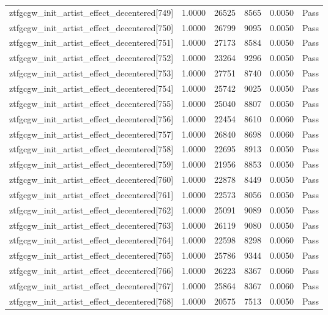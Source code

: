 \begin{table}[htbp]
\begin{tabular}{llrrll}
ztfgcgw\_init\_artist\_effect\_decentered[749] & 1.0000 & 26525 & 8565 & 0.0050 & Pass \\
ztfgcgw\_init\_artist\_effect\_decentered[750] & 1.0000 & 26799 & 9095 & 0.0050 & Pass \\
ztfgcgw\_init\_artist\_effect\_decentered[751] & 1.0000 & 27173 & 8584 & 0.0050 & Pass \\
ztfgcgw\_init\_artist\_effect\_decentered[752] & 1.0000 & 23264 & 9296 & 0.0050 & Pass \\
ztfgcgw\_init\_artist\_effect\_decentered[753] & 1.0000 & 27751 & 8740 & 0.0050 & Pass \\
ztfgcgw\_init\_artist\_effect\_decentered[754] & 1.0000 & 25742 & 9025 & 0.0050 & Pass \\
ztfgcgw\_init\_artist\_effect\_decentered[755] & 1.0000 & 25040 & 8807 & 0.0050 & Pass \\
ztfgcgw\_init\_artist\_effect\_decentered[756] & 1.0000 & 22454 & 8610 & 0.0060 & Pass \\
ztfgcgw\_init\_artist\_effect\_decentered[757] & 1.0000 & 26840 & 8698 & 0.0060 & Pass \\
ztfgcgw\_init\_artist\_effect\_decentered[758] & 1.0000 & 22695 & 8913 & 0.0050 & Pass \\
ztfgcgw\_init\_artist\_effect\_decentered[759] & 1.0000 & 21956 & 8853 & 0.0050 & Pass \\
ztfgcgw\_init\_artist\_effect\_decentered[760] & 1.0000 & 22878 & 8449 & 0.0050 & Pass \\
ztfgcgw\_init\_artist\_effect\_decentered[761] & 1.0000 & 22573 & 8056 & 0.0050 & Pass \\
ztfgcgw\_init\_artist\_effect\_decentered[762] & 1.0000 & 25091 & 9089 & 0.0050 & Pass \\
ztfgcgw\_init\_artist\_effect\_decentered[763] & 1.0000 & 26119 & 9080 & 0.0050 & Pass \\
ztfgcgw\_init\_artist\_effect\_decentered[764] & 1.0000 & 22598 & 8298 & 0.0060 & Pass \\
ztfgcgw\_init\_artist\_effect\_decentered[765] & 1.0000 & 25786 & 9344 & 0.0050 & Pass \\
ztfgcgw\_init\_artist\_effect\_decentered[766] & 1.0000 & 26223 & 8367 & 0.0060 & Pass \\
ztfgcgw\_init\_artist\_effect\_decentered[767] & 1.0000 & 25864 & 8367 & 0.0060 & Pass \\
ztfgcgw\_init\_artist\_effect\_decentered[768] & 1.0000 & 20575 & 7513 & 0.0050 & Pass \\

\end{tabular}
\end{table}
